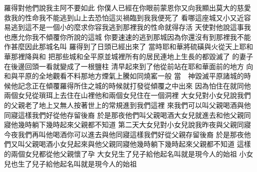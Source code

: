 羅得對他們說\chientien 我主阿\chientien 不要如此\yuentien 
{}你僕人已經在你眼前蒙恩\chientien 你又向我顯出莫大的慈愛\chientien 救我的性命\chientien 我不能逃到山上去\chientien 恐怕這災禍臨到我\chientien 我便死了\chuan 
{}看哪\chientien 這座城又小又近\chientien 容易逃到\chientien 這不是一個小的麼\yuentien 求你容我逃到那裡\chientien 我的性命就得存活\chuan 
{}天使對他說\chientien 這事我也應允你\chientien 我不傾覆你所說的這城\chientien 
{}你要速速的逃到那城\chientien 因為你還沒有到那裡我不能作甚麼\chuan 因此那城名叫\chuan{}\hss\linebreak{}\Chuan
{}羅得到了\chientien 日頭已經出來了\chuan 
{}當時耶和華將硫磺與火\chientien 從天上耶和華那裡\chientien 降與和\chientien 
{}把那些城\chientien 和全平原\chientien 並城裡所有的居民\chientien 連地上生長的\chientien 都毀滅了\chuan 
{}的妻子在後邊回頭一看\chientien 就變成了一根鹽柱\chuan 
{}清早起來\chientien 到了他從前站在耶和華面前的地方\chientien 
{}向\chientien 和\chientien 與平原的全地觀看\yuentien 不料\chientien 那地方煙氣上騰\chientien 如同燒窰一般\chuan\Chuan
{}當　神毀滅平原諸城的時候\chientien 他記念\chientien 正在傾覆羅得所住之城的時候\chientien 就打發從傾覆之中出來\chuan\Chuan
{}因為怕住在\chientien 就同他兩個女兒從瑣珥上去住在山裡\yuentien 他和兩個女兒住在一個洞裡\chuan 
{}大女兒對小女兒說\chientien 我們的父親老了\chientien 地上又無人按著世上的常規\chientien 進到我們這裡\yuentien 
{}來\chientien 我們可以叫父親喝酒\chientien 與他同寢\yuentien 這樣\chientien 我們好從他存留後裔\chuan 
{}於是那夜他們叫父親喝酒\chientien 大女兒就進去和他父親同寢\yuentien 他幾時躺下\chientien 幾時起來\chientien 父親都不知道\chuan 
{}第二天\chientien 大女兒對小女兒說\chientien 我昨夜與父親同寢\chientien 今夜我們再叫他喝酒\chientien 你可以進去與他同寢\yuentien 這樣\chientien 我們好從父親存留後裔\yuentien 
{}於是那夜他們又叫父親喝酒\chientien 小女兒起來與他父親同寢\yuentien 他幾時躺下\chientien 幾時起來\chientien 父親都不知道\chuan 
{}這樣\chientien{}的兩個女兒\chientien 都從他父親懷了孕\chuan 
{}大女兒生了兒子\chientien 給他起名叫\chientien 就是現今人的始祖\chuan 
{}小女兒也生了兒子\chientien 給他起名叫\chientien 就是現今人的始祖\chuan 
